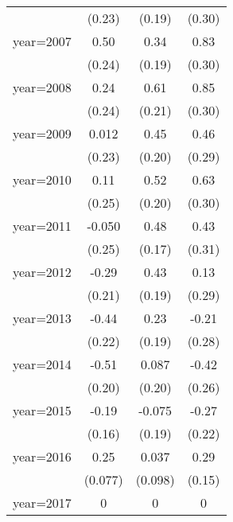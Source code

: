 \begin{sidewaystable}[htbp]
\begin{tabular}{l*{3}{c}}
                &   (0.23)         &   (0.19)         &   (0.30)         \\
\addlinespace
year=2007       &     0.50\sym{**} &     0.34\sym{*}  &     0.83\sym{***}\\
                &   (0.24)         &   (0.19)         &   (0.30)         \\
\addlinespace
year=2008       &     0.24         &     0.61\sym{***}&     0.85\sym{***}\\
                &   (0.24)         &   (0.21)         &   (0.30)         \\
\addlinespace
year=2009       &    0.012         &     0.45\sym{**} &     0.46         \\
                &   (0.23)         &   (0.20)         &   (0.29)         \\
\addlinespace
year=2010       &     0.11         &     0.52\sym{**} &     0.63\sym{**} \\
                &   (0.25)         &   (0.20)         &   (0.30)         \\
\addlinespace
year=2011       &   -0.050         &     0.48\sym{***}&     0.43         \\
                &   (0.25)         &   (0.17)         &   (0.31)         \\
\addlinespace
year=2012       &    -0.29         &     0.43\sym{**} &     0.13         \\
                &   (0.21)         &   (0.19)         &   (0.29)         \\
\addlinespace
year=2013       &    -0.44\sym{**} &     0.23         &    -0.21         \\
                &   (0.22)         &   (0.19)         &   (0.28)         \\
\addlinespace
year=2014       &    -0.51\sym{**} &    0.087         &    -0.42         \\
                &   (0.20)         &   (0.20)         &   (0.26)         \\
\addlinespace
year=2015       &    -0.19         &   -0.075         &    -0.27         \\
                &   (0.16)         &   (0.19)         &   (0.22)         \\
\addlinespace
year=2016       &     0.25\sym{***}&    0.037         &     0.29\sym{*}  \\
                &  (0.077)         &  (0.098)         &   (0.15)         \\
\addlinespace
year=2017       &        0         &        0         &        0         \\

\end{tabular}
\end{sidewaystable}
